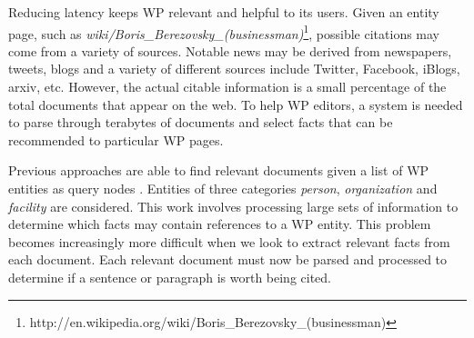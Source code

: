 \documentclass[letterpaper]{article}
\begin{document}
Reducing latency keeps WP relevant and helpful to its users.
Given an entity page, such as \textsl{wiki/Boris\_Berezovsky\_(businessman)}\footnote{http://en.wikipedia.org/wiki/Boris\_Berezovsky\_(businessman)},
possible citations may come from a variety of sources.
Notable news may be derived from newspapers, tweets, blogs and a variety of
different sources include Twitter, Facebook, iBlogs, arxiv, etc.
However, the actual citable information is a small percentage of the total documents that appear on the web.
To help WP editors, a system is needed to parse through terabytes of documents 
and select facts that can be recommended to particular WP pages.


Previous approaches are able to find relevant documents given a list of WP
entities as query nodes \cite{mcnamee2012hltcoe, dalton2013bi,
Bonnefoy:2013:WDE:2484028.2484180, Balog:2013:CCR:2484028.2484151,ji2011knowledge}.
Entities of three categories \textit{person}, \textit{organization} and \textit{facility} are considered.
This work involves processing large sets of information to determine which facts may contain references to a WP entity. 
This problem becomes increasingly more difficult when we look to extract relevant facts from
each document.
Each relevant document must now be parsed and processed to determine if a sentence or paragraph is worth being cited.
\end{document}
